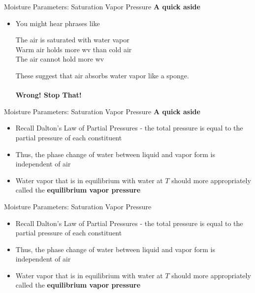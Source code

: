 
\begin{frame}{Moisture Parameters: Saturation Vapor Pressure}
\textbf{A quick aside}
\begin{itemize}
	\item You might hear phrases like
	\begin{fancyquotes}
		The air is saturated with water vapor\\
		Warm air holds more wv than cold air\\
		The air cannot hold more wv
	\end{fancyquotes}
	These suggest that air absorbs water vapor like a sponge.\\~\\
	\textbf{Wrong! Stop That!}
\end{itemize}
\end{frame}


\begin{frame}{Moisture Parameters: Saturation Vapor Pressure}
\textbf{A quick aside}
\begin{itemize}
	\item Recall Dalton's Law of Partial Pressures - the total pressure is equal to the partial pressure of each constituent
	\item Thus, the phase change of water between liquid and vapor form is independent of air
	\item Water vapor that is in equilibrium with water at $T$ should more appropriately called the \textbf{equilibrium vapor pressure}
\end{itemize}
\end{frame}


\begin{frame}{Moisture Parameters: Saturation Vapor Pressure}
\begin{itemize}
	\item Recall Dalton's Law of Partial Pressures - the total pressure is equal to the partial pressure of each constituent
	\item Thus, the phase change of water between liquid and vapor form is independent of air
	\item Water vapor that is in equilibrium with water at $T$ should more appropriately called the \textbf{equilibrium vapor pressure}
\end{itemize}
\end{frame}

